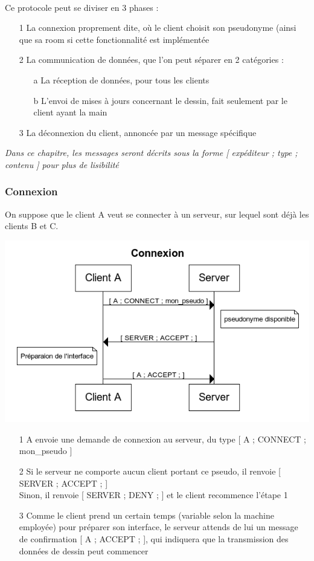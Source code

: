 \documentclass[a4paper,11pt]{article}
\begin{document}
\paragraph{}Ce protocole peut se diviser en 3 phases : 
\begin{itemize}
	\item[1] La connexion proprement dite, où le client choisit son pseudonyme (ainsi que sa room si cette fonctionnalité est implémentée
	\item[2] La communication de données, que l'on peut séparer en 2 catégories :
	\begin{itemize}
		\item[a] La réception de données, pour tous les clients
		\item[b] L'envoi de mises à jours concernant le dessin, fait seulement par le client ayant la main
	\end{itemize}
	\item[3] La déconnexion du client, annoncée par un message spécifique
\end{itemize}

\textit{Dans ce chapitre, les messages seront décrits sous la forme [ expéditeur ; type ; contenu ] pour plus de lisibilité}

\subsubsection{Connexion}
On suppose que le client A veut se connecter à un serveur, sur lequel sont déjà les clients B et C.

\includegraphics[scale=1]{image/Connexion.png}
\begin{itemize}
	\item[1] A envoie une demande de connexion au serveur, du type [ A ; CONNECT ; mon\_pseudo ]
	\item[2] Si le serveur ne comporte aucun client portant ce pseudo, il renvoie [ SERVER ; ACCEPT ; ] \\
	Sinon, il renvoie [ SERVER ; DENY ; ] et le client recommence l'étape 1
	\item[3] Comme le client prend un certain temps (variable selon la machine employée) pour préparer son interface, le serveur attends de lui un message de confirmation [ A ; ACCEPT ; ], qui indiquera que la transmission des données de dessin peut commencer
\end{itemize}
\end{document}
